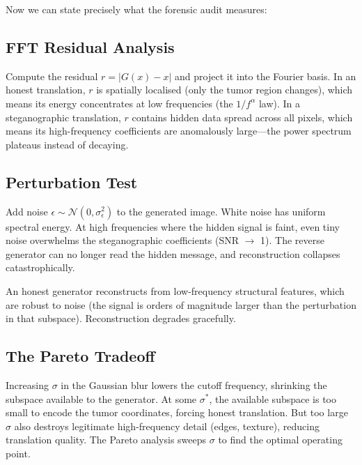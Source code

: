 \documentclass[11pt,a4paper]{article}
\theoremstyle{definition}
\begin{document}
Now we can state precisely what the forensic audit measures:

\subsection{FFT Residual Analysis}

Compute the residual $r = |G(x) - x|$ and project it into the Fourier basis. In an honest translation, $r$ is spatially localised (only the tumor region changes), which means its energy concentrates at low frequencies (the $1/f^\alpha$ law). In a steganographic translation, $r$ contains hidden data spread across all pixels, which means its high-frequency coefficients are anomalously large---the power spectrum plateaus instead of decaying.

\subsection{Perturbation Test}

Add noise $\epsilon \sim \mathcal{N}(0, \sigma_\epsilon^2)$ to the generated image. White noise has uniform spectral energy. At high frequencies where the hidden signal is faint, even tiny noise overwhelms the steganographic coefficients (SNR $\to$ 1). The reverse generator can no longer read the hidden message, and reconstruction collapses catastrophically.

An honest generator reconstructs from low-frequency structural features, which are robust to noise (the signal is orders of magnitude larger than the perturbation in that subspace). Reconstruction degrades gracefully.

\subsection{The Pareto Tradeoff}

Increasing $\sigma$ in the Gaussian blur lowers the cutoff frequency, shrinking the subspace available to the generator. At some $\sigma^*$, the available subspace is too small to encode the tumor coordinates, forcing honest translation. But too large $\sigma$ also destroys legitimate high-frequency detail (edges, texture), reducing translation quality. The Pareto analysis sweeps $\sigma$ to find the optimal operating point.
\end{document}
